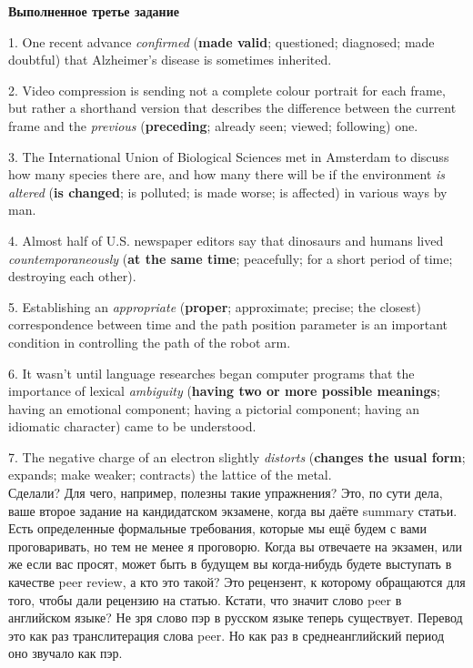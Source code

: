 \documentclass[main.tex]{subfiles}
\begin{document}
\textbf{Выполненное третье задание}

1. One recent advance \textit{confirmed} (\textbf{made valid}; questioned; diagnosed; made doubtful) that Alzheimer's disease is sometimes inherited.

2. Video compression is sending not a complete colour portrait for each frame, but rather a shorthand version that describes the difference between the current frame and the \textit{previous} (\textbf{preceding}; already seen; viewed; following) one.

3. The International Union of Biological Sciences met in Amsterdam to discuss how many species there are, and how many there will be if the environment \textit{is altered} (\textbf{is changed}; is polluted; is made worse; is affected) in various ways by man. 

4. Almost half of U.S. newspaper editors say that dinosaurs and humans lived \textit{countemporaneously} (\textbf{at the same time}; peacefully; for a short period of time; destroying each other).

5. Establishing an \textit{appropriate} (\textbf{proper}; approximate; precise; the closest) correspondence between time and the path position parameter is an important condition in controlling the path of the robot arm.

6. It wasn't until language researches began computer programs that the importance of lexical \textit{ambiguity} (\textbf{having two or more possible meanings}; having an emotional component; having a pictorial component; having an idiomatic character) came to be understood.

7. The negative charge of an electron slightly \textit{distorts} (\textbf{changes the usual form}; expands; make weaker; contracts) the lattice of the metal.
\\

Сделали?
Для чего, например, полезны такие упражнения?
Это, по сути дела, ваше второе задание на кандидатском экзамене, когда вы даёте summary статьи.
Есть определенные формальные требования, которые мы ещё будем с вами проговаривать, но тем не менее я проговорю.
Когда вы отвечаете на экзамен, или же если вас просят, может быть в будущем вы когда-нибудь будете выступать в качестве peer review, а кто это такой?
Это рецензент, к которому обращаются для того, чтобы дали рецензию на статью.
Кстати, что значит слово peer в английском языке?
Не зря слово пэр в русском языке теперь существует.
Перевод это как раз транслитерация слова peer.
Но как раз в среднеанглийский период оно звучало как пэр.
\end{document}
